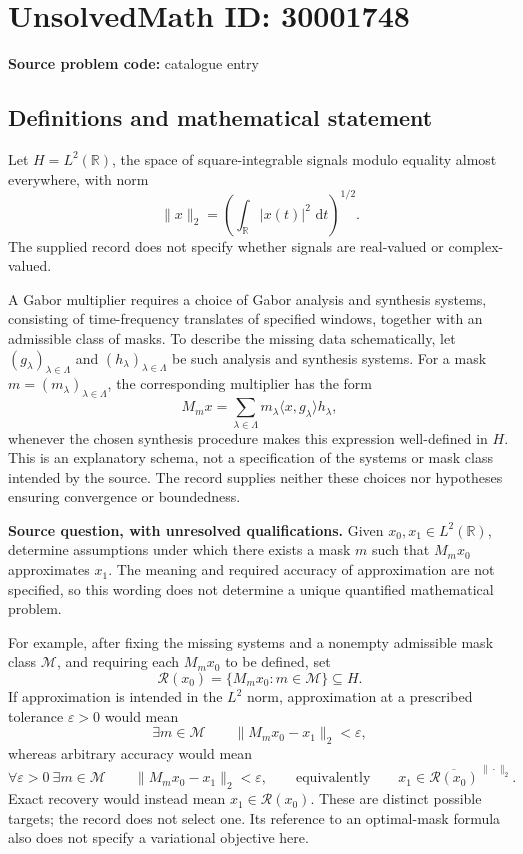 \documentclass[11pt]{article}
\newcommand{\R}{\mathbb{R}}
\newcommand{\dd}{\,\mathrm{d}}
\begin{document}
\section*{UnsolvedMath ID: 30001748}
\textbf{Source problem code:} catalogue entry
\subsection{Definitions and mathematical statement}
Let \(H=L^2(\R)\), the space of square-integrable signals modulo equality almost everywhere, with norm
\[
\|x\|_2=\left(\int_{\R}|x(t)|^2\,\dd t\right)^{1/2}.
\]
The supplied record does not specify whether signals are real-valued or complex-valued.

A Gabor multiplier requires a choice of Gabor analysis and synthesis systems, consisting of time-frequency translates of specified windows, together with an admissible class of masks. To describe the missing data schematically, let \((g_\lambda)_{\lambda\in\Lambda}\) and \((h_\lambda)_{\lambda\in\Lambda}\) be such analysis and synthesis systems. For a mask \(m=(m_\lambda)_{\lambda\in\Lambda}\), the corresponding multiplier has the form
\[
M_m x=\sum_{\lambda\in\Lambda}m_\lambda\langle x,g_\lambda\rangle h_\lambda,
\]
whenever the chosen synthesis procedure makes this expression well-defined in \(H\). This is an explanatory schema, not a specification of the systems or mask class intended by the source. The record supplies neither these choices nor hypotheses ensuring convergence or boundedness.

\textbf{Source question, with unresolved qualifications.} Given \(x_0,x_1\in L^2(\R)\), determine assumptions under which there exists a mask \(m\) such that \(M_mx_0\) approximates \(x_1\). The meaning and required accuracy of approximation are not specified, so this wording does not determine a unique quantified mathematical problem.

For example, after fixing the missing systems and a nonempty admissible mask class \(\mathcal M\), and requiring each \(M_mx_0\) to be defined, set
\[
\mathcal R(x_0)=\{M_mx_0:m\in\mathcal M\}\subseteq H.
\]
If approximation is intended in the \(L^2\) norm, approximation at a prescribed tolerance \(\varepsilon>0\) would mean
\[
\exists m\in\mathcal M\qquad \|M_mx_0-x_1\|_2<\varepsilon,
\]
whereas arbitrary accuracy would mean
\[
\forall\varepsilon>0\ \exists m\in\mathcal M\qquad
\|M_mx_0-x_1\|_2<\varepsilon,
\qquad\text{equivalently}\qquad
x_1\in\overline{\mathcal R(x_0)}^{\,\|\cdot\|_2}.
\]
Exact recovery would instead mean \(x_1\in\mathcal R(x_0)\). These are distinct possible targets; the record does not select one. Its reference to an optimal-mask formula also does not specify a variational objective here.
\end{document}
